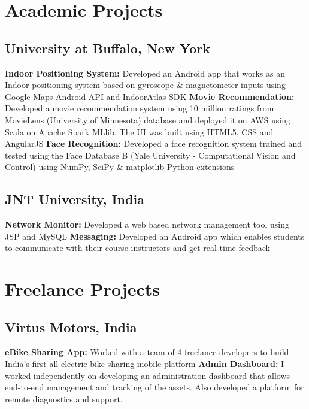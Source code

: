 \documentclass[12pt,a4paper,sans]{moderncv}
\begin{document}
\vspace{0.5cm}
\section{Academic Projects}
\subsection{University at Buffalo, New York}
{\textbf{Indoor Positioning System:} Developed an Android app that works as an Indoor positioning system based on gyroscope \& magnetometer inputs using Google Maps Android API and IndoorAtlas SDK}
{\textbf{Movie Recommendation:} Developed a movie recommendation system using 10 million ratings from MovieLens (University of Minnesota) database and deployed it on AWS using Scala on Apache Spark MLlib. The UI was built using HTML5, CSS and AngularJS}
{\textbf{Face Recognition:} Developed a face recognition system trained and tested using the Face Database B (Yale University - Computational Vision and Control) using NumPy, SciPy \& matplotlib Python extensions}{}
\vspace{0.1cm}
\subsection{JNT University, India}
{\textbf{Network Monitor:} Developed a web based network management tool using JSP and MySQL}
{\textbf{Messaging:} Developed an Android app which enables students to communicate with their course instructors and get real-time feedback }

\section{Freelance Projects}
\subsection{Virtus Motors, India}
{\textbf{eBike Sharing App:} Worked with a team of 4 freelance developers to build India's first all-electric bike sharing mobile platform}
{\textbf{Admin Dashboard:} I worked independently on developing an administration dashboard that allows end-to-end management and tracking of the assets. Also developed a platform for remote diagnostics and support. }
\end{document}
